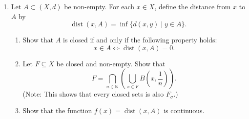 \documentclass[notoc,notitlepage]{tufte-book}
\DeclareMathOperator{\dist}{dist }
\begin{document}
\begin{enumerate}
  \item Let $A \subset (X, d)$ be non-empty. For each $x \in X$, define the distance from $x$ to $A$ by
    \begin{equation*}
      \dist(x, A) = \inf \{ d(x, y) \mid y \in A \}.
    \end{equation*}
    \begin{enumerate}
      \item Show that $A$ is closed if and only if the following property holds:
        \begin{equation*}
          x \in A \iff \dist(x, A) = 0.
        \end{equation*}
      \item Let $F \subseteq X$ be closed and non-empty. Show that
        \begin{equation*}
          F = \bigcap_{n \in \mathbb{N}} \left( \bigcup_{x \in F} B \left( x, \frac{1}{n} \right) \right).
        \end{equation*}
        (Note: This shows that every closed sets is also $F_\sigma$.)
      \item Show that the function $f(x) = \dist(x, A)$ is continuous.
    \end{enumerate}


\end{enumerate}
\end{document}
